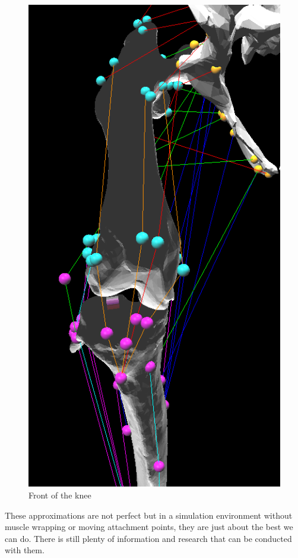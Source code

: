 \documentclass[runningheads,a4paper]{llncs}
\begin{document}
\begin{figure}
\begin{minipage}{0.4\textwidth}
					\includegraphics[width=\textwidth]{att6.PNG}
					\caption{Front of the knee}
				\end{minipage}
			\end{figure}
			\FloatBarrier
	These approximations are not perfect but in a simulation environment without muscle wrapping or moving attachment points, they are just about the best we can do. There is still plenty of information and research that can be conducted with them. \par
\end{document}

